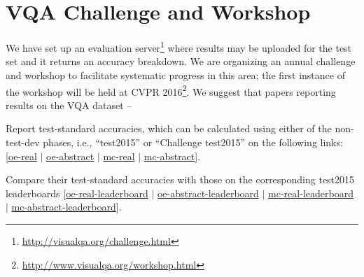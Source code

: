 \section{VQA Challenge and Workshop}
\label{sec:challenge}

We have set up an evaluation server\footnote{\url{http://visualqa.org/challenge.html}} where results may be uploaded for the test set and it returns an accuracy breakdown. We are organizing an annual challenge and workshop to facilitate systematic progress in this area; the first instance of the workshop will be held at CVPR 2016\footnote{\url{http://www.visualqa.org/workshop.html}}. We suggest that papers reporting results on the VQA dataset --

\begin{compactenum}

\item Report test-standard accuracies, which can be calculated using either of the non-test-dev phases, i.e., ``test2015'' or ``Challenge test2015'' on the following links: [\href{https://www.codalab.org/competitions/6961}{oe-real} $|$ \href{https://www.codalab.org/competitions/6981}{oe-abstract} $|$ \href{https://www.codalab.org/competitions/6971}{mc-real} $|$ \href{https://www.codalab.org/competitions/6991}{mc-abstract}].

\item Compare their test-standard accuracies with those on the corresponding test2015 leaderboards [\href{http://www.visualqa.org/roe.html}{oe-real-leaderboard} $|$ \href{http://www.visualqa.org/aoe.html}{oe-abstract-leaderboard} $|$ \href{http://www.visualqa.org/rmc.html}{mc-real-leaderboard} $|$ \href{http://www.visualqa.org/amc.html}{mc-abstract-leaderboard}].

\end{compactenum}

